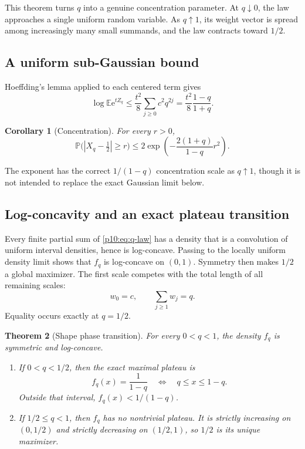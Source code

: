 \documentclass[11pt]{article}
\numberwithin{equation}{section}
\newtheorem{theorem}{Theorem}[section]
\newtheorem{corollary}[theorem]{Corollary}
\theoremstyle{definition}
\theoremstyle{remark}
\newcommand{\E}{\mathbb E}
\newcommand{\Prob}{\mathbb P}
\newcommand{\e}{\mathrm e}
\begin{document}
This theorem turns $q$ into a genuine concentration parameter.  At $q\downarrow0$, the law
approaches a single uniform random variable.  As $q\uparrow1$, its weight vector is spread
among increasingly many small summands, and the law contracts toward $1/2$.

\subsection{A uniform sub-Gaussian bound}

Hoeffding's lemma applied to each centered term gives
\[
 \log\E\e^{tZ_q}
 \le\frac{t^2}{8}\sum_{j\ge0}c^2q^{2j}
 =\frac{t^2}{8}\frac{1-q}{1+q}.
\]

\begin{corollary}[Concentration]
\label{p10:cor:concentration}
For every $r>0$,
\begin{equation}
 \Prob\bigl(|X_q-\tfrac12|\ge r\bigr)
 \le2\exp\!\left(-\frac{2(1+q)}{1-q}r^2\right).             \label{p10:eq:hoeffding}
\end{equation}
\end{corollary}

The exponent has the correct $1/(1-q)$ concentration scale as $q\uparrow1$, though it is not
intended to replace the exact Gaussian limit below.

\subsection{Log-concavity and an exact plateau transition}

Every finite partial sum of \eqref{p10:eq:q-law} has a density that is a convolution of uniform
interval densities, hence is log-concave.  Passing to the locally uniform density limit shows
that $f_q$ is log-concave on $(0,1)$.  Symmetry then makes $1/2$ a global maximizer.
The first scale competes with the total length of all remaining scales:
\[
 w_0=c,
 \qquad
 \sum_{j\ge1}w_j=q.
\]
Equality occurs exactly at $q=1/2$.

\begin{theorem}[Shape phase transition]
\label{p10:thm:plateau}
For every $0<q<1$, the density $f_q$ is symmetric and log-concave.

\begin{enumerate}[label=\textup{(\roman*)}]
\item If $0<q<1/2$, then the exact maximal plateau is
\begin{equation}
 f_q(x)=\frac{1}{1-q}
 \quad\Longleftrightarrow\quad q\le x\le1-q.                 \label{p10:eq:plateau}
\end{equation}
Outside that interval, $f_q(x)<1/(1-q)$.
\item If $1/2\le q<1$, then $f_q$ has no nontrivial plateau.  It is strictly increasing on
$(0,1/2)$ and strictly decreasing on $(1/2,1)$, so $1/2$ is its unique maximizer.
\end{enumerate}
\end{theorem}
\end{document}
